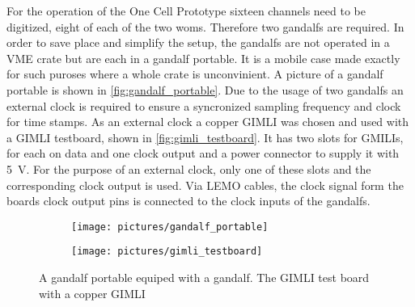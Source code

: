 For the operation of the One Cell Prototype sixteen channels need to be digitized, eight of each of the two \acp{wom}.
Therefore two \acp{gandalf} are required.
In order to save place and simplify the setup, the \acp{gandalf} are not operated in a VME crate but are each in a \ac{gandalf} portable.
It is a mobile case made exactly for such puroses where a whole crate is unconvinient.
A picture of a \ac{gandalf} portable is shown in \autoref{fig:gandalf_portable}.
Due to the usage of two \acp{gandalf} an external clock is required to ensure a syncronized sampling frequency and clock for time stamps.
As an external clock a copper GIMLI was chosen and used with a GIMLI testboard, shown in \autoref{fig:gimli_testboard}.
It has two slots for GMILIs, for each on data and one clock output and a power connector to supply it with \SI{5}{\volt}.
For the purpose of an external clock, only one of these slots and the corresponding clock output is used.
Via LEMO cables, the clock signal form the boards clock output pins is connected to the clock inputs of the \acp{gandalf}.
\begin{figure}
	\centering
	\begin{subfigure}[b]{.4\textwidth}
		\centering
		\texttt{[image: pictures/gandalf\_portable]} 
		\caption[A \ac{gandalf} portable equiped with a \ac{gandalf}.]{}
		\label{}
	\end{subfigure}
	\begin{subfigure}[b]{.55\textwidth}
		\centering
		\texttt{[image: pictures/gimli\_testboard]}
		\caption[]{}
		\label{}
	\end{subfigure}
	\caption[]{A \ac{gandalf} portable equiped with a \ac{gandalf}. The GIMLI test board with a copper GIMLI}
	\label{}
\end{figure}
